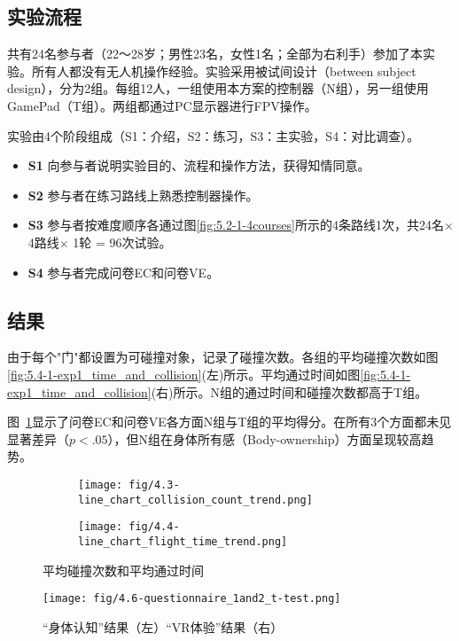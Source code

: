 \subsection{实验流程}
共有24名参与者（22～28岁；男性23名，女性1名；全部为右利手）参加了本实验。所有人都没有无人机操作经验。实验采用被试间设计（between subject design），分为2组。每组12人，一组使用本方案的控制器（N组），另一组使用GamePad（T组）。两组都通过PC显示器进行FPV操作。

实验由4个阶段组成（S1：介绍，S2：练习，S3：主实验，S4：对比调查）。

\begin{itemize}
    \item \textbf{S1} 向参与者说明实验目的、流程和操作方法，获得知情同意。
    \item \textbf{S2} 参与者在练习路线上熟悉控制器操作。
    \item \textbf{S3} 参与者按难度顺序各通过图\ref{fig:5.2-1-4courses}所示的4条路线1次，共24名$\times$ 4路线$\times$ 1轮 = 96次试验。
    \item \textbf{S4} 参与者完成问卷EC和问卷VE。
\end{itemize}


\subsection{结果}\label{study1_result}

由于每个"门"都设置为可碰撞对象，记录了碰撞次数。各组的平均碰撞次数如图\ref{fig:5.4-1-exp1_time_and_collision}(左)所示。平均通过时间如图\ref{fig:5.4-1-exp1_time_and_collision}(右)所示。N组的通过时间和碰撞次数都高于T组。

图~\ref{fig:5.4-1-result-Q1Q2}显示了问卷EC和问卷VE各方面N组与T组的平均得分。在所有3个方面都未见显著差异（$p<.05$），但N组在身体所有感（Body-ownership）方面呈现较高趋势。

\begin{figure}[t]
    \centering
    \begin{subfigure}[b]{0.48\textwidth}
        \texttt{[image: fig/4.3-line\_chart\_collision\_count\_trend.png]}
    \end{subfigure}
    \begin{subfigure}[b]{0.48\textwidth}
        \texttt{[image: fig/4.4-line\_chart\_flight\_time\_trend.png]}
    \end{subfigure}
    \caption{\label{fig:5.4-1-exp1_time_and_collision}平均碰撞次数和平均通过时间}

    \centering
    \texttt{[image: fig/4.6-questionnaire\_1and2\_t-test.png]}
    \caption{\label{fig:5.4-1-result-Q1Q2}“身体认知”结果（左）“VR体验”结果（右）}
\end{figure}

